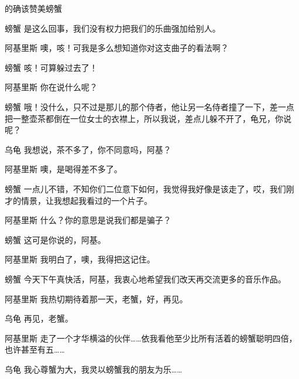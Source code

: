 \begin{dialog}{的确该赞美螃蟹}
\begin{dialogue}
\item[螃蟹]是这么回事，我们没有权力把我们的乐曲强加给别人。

\item[阿基里斯]噢，咳！可我是多么想知道你对这支曲子的看法啊？

\item[螃蟹]咳！可算躲过去了！

\item[阿基里斯]你在说什么呢？

\item[螃蟹]哦！没什么，只不过是那儿的那个侍者，他让另一名侍者撞了一下，差一点把一整壶茶都倒在一位女士的衣襟上，所以我说，差点儿躲不开了，龟兄，你说呢？

\item[乌龟]我想说，茶不多了，你不同意吗，阿基？

\item[阿基里斯]噢，是喝得差不多了。

\item[螃蟹]一点儿不错，不知你们二位意下如何，我觉得我好像是该走了，哎，我们刚才的情景，让我想起我看过的一个片子。

\item[阿基里斯]什么？你的意思是说我们都是骗子？

\item[螃蟹]这可是你说的，阿基。

\item[阿基里斯]我明白了，噢，我得把这记住。

\item[螃蟹]今天下午真快活，阿基，我衷心地希望我们改天再交流更多的音乐作品。

\item[阿基里斯]我热切期待着那一天，老蟹，好，再见。

\item[乌龟]再见，老蟹。


\item[阿基里斯]走了一个才华横溢的伙伴……依我看他至少比所有活着的螃蟹聪明四倍，也许甚至有五……

\item[乌龟]我心尊蟹为大，我灵以螃蟹我的朋友为乐……

\end{dialogue}

\end{dialog}
